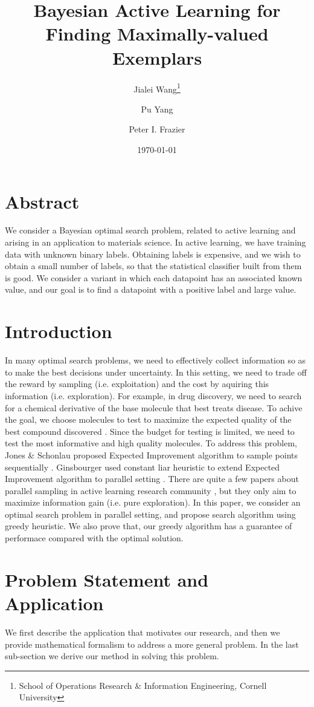 \documentclass[11pt]{article}
\title{Bayesian Active Learning for Finding Maximally-valued Exemplars}
\date{\today}
\author{Jialei Wang\thanks{School of Operations Research \& Information Engineering, Cornell University} \and 
Pu Yang\footnotemark[1] \and
Peter I. Frazier\footnotemark[1] \and
}
\begin{document}
\maketitle

\section{Abstract}
We consider a Bayesian optimal search problem, related to active learning and arising in an application to materials science. In active learning, we have training data with unknown binary labels. Obtaining labels is expensive, and we wish to obtain a small number of labels, so that the statistical classifier built from them is good. We consider a variant in which each datapoint has an associated known value, and our goal is to find a datapoint with a positive label and large value.

\section{Introduction}
In many optimal search problems, we need to effectively collect information so as to make the best decisions under uncertainty. In this setting, we need to trade off the reward by sampling (i.e. exploitation) and the cost by aquiring this information (i.e. exploration). For example, in drug discovery, we need to search for a chemical derivative of the base molecule that best treats disease. To achive the goal, we choose molecules to test  to maximize the expected quality of the best compound discovered \cite{Negoescu2010}. Since the budget for testing is limited, we need to test the most informative and high quality molecules. To address this problem, Jones \& Schonlau proposed Expected Improvement algorithm to sample points sequentially \cite{Jones1998} . Ginsbourger used constant liar heuristic to extend Expected Improvement algorithm to parallel setting \cite{Ginsbourger2008} . There are quite a few papers about parallel sampling in active learning research community \cite{Chen2013, Hoi2006, Hoi2006a} , but they only aim to maximize information gain (i.e. pure exploration). In this paper, we consider an optimal search problem in parallel setting, and propose search algorithm using greedy heuristic. We also prove that, our greedy algorithm has a guarantee of performace compared with the optimal solution.

\section{Problem Statement and Application}
We first describe the application that motivates our research, and then we provide mathematical formalism to address a more general problem. In the last sub-section we derive our method in solving this problem.
\end{document}
